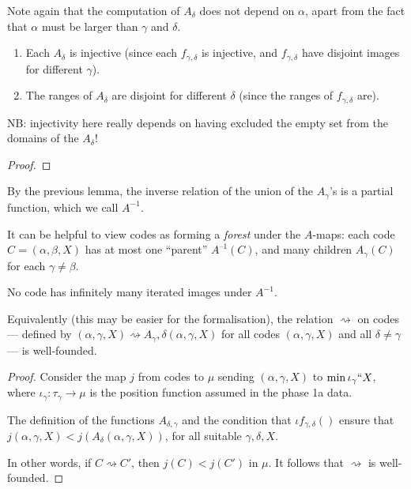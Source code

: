Note again that the computation of $A_\delta$ does not depend on $\alpha$, apart from the fact that $\alpha$ must be larger than $\gamma$ and $\delta$.

\begin{lemma}
\label {lem:a-map-properties}
\leanok
\begin{enumerate}
\item Each $A_\delta$ is injective (since each $f_{\gamma,\delta}$ is injective, and $f_{\gamma,\delta}$ have disjoint images for different $\gamma$).
\item The ranges of $A_\delta$ are disjoint for different $\delta$ (since the ranges of $f_{\gamma,\delta}$ are).
\end{enumerate}

NB: injectivity here really depends on having excluded the empty set from the domains of the $A_\delta$!
\end{lemma}
\begin{proof}\leanok\end{proof}

\begin{definition}
\label {def:ainverse}
\leanok
By the previous lemma, the inverse relation of the union of the $A_\gamma$'s is a partial function, which we call $A^{-1}$.

It can be helpful to view codes as forming a \emph{forest} under the $A$-maps: each code $C = (\alpha,\beta,X)$ has at most one “parent” $A^{–1}(C)$, and many children $A_\gamma(C)$ for each $\gamma \neq \beta$.
\end{definition}

\begin{lemma}
\label{lem:ainverse-stops}
\leanok
No code has infinitely many iterated images under $A^{-1}$.

Equivalently (this may be easier for the formalisation), the relation $\rightsquigarrow$ on codes --- defined by $ (\alpha,\gamma ,X) \rightsquigarrow A_\gamma,\delta (\alpha,\gamma ,X)$ for all codes $ (\alpha,\gamma ,X)$ and all $\delta \neq \gamma$ --- is well-founded.
\end{lemma}

\begin{proof}
  \leanok
  Consider the map $j$ from codes to $\mu$ sending $(\alpha,\gamma,X)$ to $\min \iota_\gamma``X$, where $\iota_\gamma : \tau_\gamma \to \mu$ is the  position function assumed in the phase 1a data.

  The definition of the functions $A_{\delta,\gamma}$ and the condition that $\iota f_{\gamma,\delta}()$ ensure that $j(\alpha,\gamma,X) < j(A_\delta(\alpha,\gamma,X))$, for all suitable $\gamma,\delta,X$.

  In other words, if $C \rightsquigarrow C'$, then $j(C) < j(C')$ in $\mu$.  It follows that $\rightsquigarrow$ is well-founded.
\end{proof}

